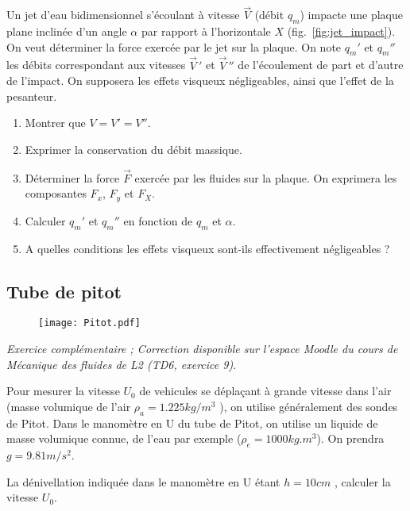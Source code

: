Un jet d'eau bidimensionnel s'\'ecoulant \`a vitesse $\vec{V}$ (d\'ebit $q_m$) impacte 
une plaque plane inclin\'ee d'un angle $\alpha$ par rapport \`a
l'horizontale $X$ (fig.~\ref{fig:jet_impact}). 
On veut d\'eterminer la force exerc\'ee par le jet sur la plaque.
On note $q_m'$ et $q_m''$ les d\'ebits correspondant aux vitesses
$\vec{V}\,'$ et $\vec{V}\,''$ de l'\'ecoulement de part et d'autre
de l'impact.
On supposera les effets visqueux n\'egligeables, ainsi que l'effet de la pesanteur.
\begin{enumerate}
\item 
  Montrer que $V = V' = V''$.
\item 
  Exprimer la conservation du d\'ebit massique.
\item 
  D\'eterminer la force $\vec{F}$ exerc\'ee par les fluides sur la plaque.
  On exprimera les composantes $F_x$, $F_y$ et $F_X$.
\item 
  Calculer $q_m'$ et $q_m''$ en fonction de $q_m$ et $\alpha$.
\item 
  A quelles conditions les effets visqueux sont-ils effectivement n\'egligeables ?
\end{enumerate}




\subsection{Tube de pitot}


\begin{figure}[htb]
  \begin{center}
      \texttt{[image: Pitot.pdf]}
      \end{center}
      \vspace{-1cm}
\end{figure}

{\em Exercice complémentaire ; Correction disponible sur l'espace Moodle du cours de Mécanique des fluides de L2 (TD6, exercice 9)}.

Pour mesurer la vitesse $U_0$ de vehicules se déplaçant à grande vitesse dans l'air (masse volumique de l’air $\rho_a = 1.225kg/m^3$ ),  on utilise généralement des sondes de Pitot. Dans le manomètre en U du tube de Pitot, on utilise un liquide de masse volumique connue, de l'eau par exemple ($\rho_e = 1000kg.m^3$). On prendra $g = 9.81 m/s^2$.

La dénivellation indiquée dans le manomètre en U étant $h =10 cm$ , calculer la vitesse $U_0$.




